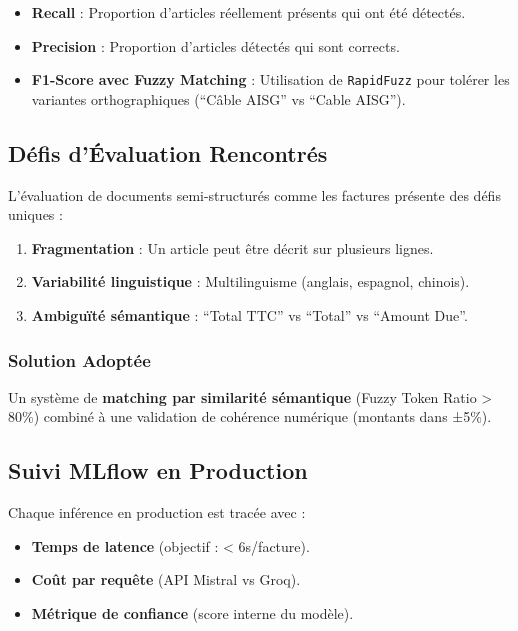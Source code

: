 \documentclass[
  letterpaper,
  DIV=11,
  numbers=noendperiod]{scrartcl}
\providecommand{\tightlist}{%
  \setlength{\itemsep}{0pt}\setlength{\parskip}{0pt}}
\begin{document}
\begin{itemize}
\tightlist
\item
  \textbf{Recall} : Proportion d'articles réellement présents qui ont
  été détectés.
\item
  \textbf{Precision} : Proportion d'articles détectés qui sont corrects.
\item
  \textbf{F1-Score avec Fuzzy Matching} : Utilisation de
  \texttt{RapidFuzz} pour tolérer les variantes orthographiques (``Câble
  AISG'' vs ``Cable AISG'').
\end{itemize}

\subsection{Défis d'Évaluation
Rencontrés}\label{duxe9fis-duxe9valuation-rencontruxe9s}

L'évaluation de documents semi-structurés comme les factures présente
des défis uniques :

\begin{enumerate}
\def\labelenumi{\arabic{enumi}.}
\item
  \textbf{Fragmentation} : Un article peut être décrit sur plusieurs
  lignes.
\item
  \textbf{Variabilité linguistique} : Multilinguisme (anglais, espagnol,
  chinois).
\item
  \textbf{Ambiguïté sémantique} : ``Total TTC'' vs ``Total'' vs ``Amount
  Due''.
\end{enumerate}

\subsubsection{Solution Adoptée}\label{solution-adoptuxe9e}

Un système de \textbf{matching par similarité sémantique} (Fuzzy Token
Ratio \textgreater{} 80\%) combiné à une validation de cohérence
numérique (montants dans ±5\%).

\subsection{Suivi MLflow en
Production}\label{suivi-mlflow-en-production}

Chaque inférence en production est tracée avec :

\begin{itemize}
\tightlist
\item
  \textbf{Temps de latence} (objectif : \textless{} 6s/facture).
\item
  \textbf{Coût par requête} (API Mistral vs Groq).
\item
  \textbf{Métrique de confiance} (score interne du modèle).
\end{itemize}
\end{document}
